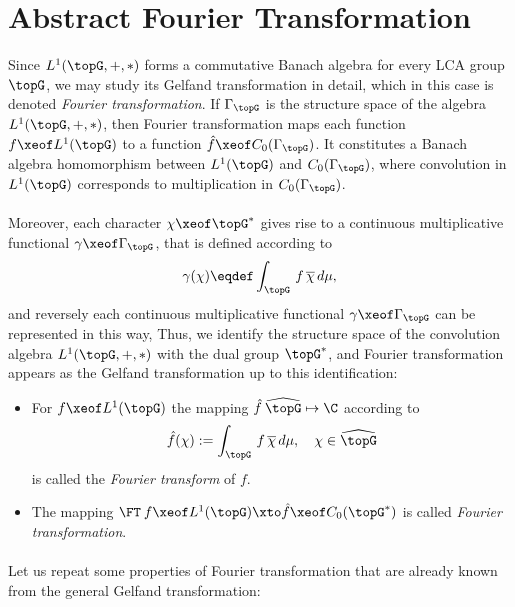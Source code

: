 \documentclass[11pt,twoside]{article}
\begin{document}
\section{Abstract Fourier Transformation}
Since $L^1(\topG,+,\ast)$ forms a commutative Banach algebra for every
LCA group $\topG$,
we may study its Gelfand transformation in detail,
which in this case is denoted \textit{Fourier transformation}.
If $\Gamma_{\topG}$ is the structure space of the algebra $L^1(\topG,+,\ast)$,
then Fourier transformation maps each function $f \xeof L^1(\topG)$
to a function $\hat{f} \xeof C_0(\Gamma_{\topG})$.
It constitutes a Banach algebra homomorphism
between $L^1(\topG)$ and $C_0(\Gamma_{\topG})$,
where convolution in $L^1(\topG)$ corresponds to multiplication
in $C_0(\Gamma_{\topG})$.

\paragraph{}
Moreover,
each character $\chi \xeof \topG^*$ gives rise to
a continuous multiplicative functional $\gamma \xeof \Gamma_{\topG}$,
that is defined according to
\[
\gamma(\chi) \eqdef \int_{\topG} \, f \, \overline{\chi} \, d\mu,
\]
and reversely each continuous multiplicative functional
$\gamma \xeof \Gamma_{\topG}$ can be represented in this way,
Thus,
we identify the structure space of the convolution algebra $L^1(\topG,+,\ast)$
with the dual group $\topG^*$,
and Fourier transformation appears as the Gelfand transformation
up to this identification:

\begin{itemize}[leftmargin=12pt]
\item[1.]
For $f \xeof L^1(\topG)$
the mapping $\hat{f} \: \widehat{\topG} \mapsto \C$ according to
\[
\hat{f}(\chi) := \int_{\topG} \, f \, \overline{\chi} \, d\mu,
\quad
\chi \in \widehat{\topG}
\]
is called the \textit{Fourier transform} of $f$.

\item[2.]
The mapping
$\FT \: f \xeof L^1(\topG) \xto \hat{f} \xeof C_0(\topG^*)$
is called \textit{Fourier transformation}.
\end{itemize}

\paragraph{} %
Let us repeat some properties of Fourier transformation
that are already known from the general Gelfand transformation:
\end{document}
